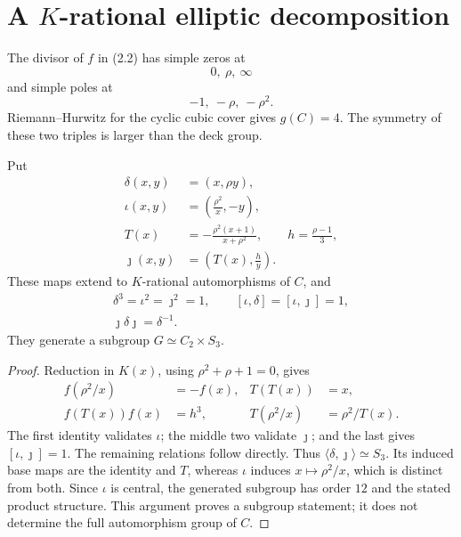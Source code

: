 \section{A \texorpdfstring{\(K\)}{K}-rational elliptic decomposition}
\label{sec:elliptic}

The divisor of \(f\) in (2.2) has simple zeros at
\[
 0,\ \rho,\ \infty
\]
and simple poles at
\[
 -1,\ -\rho,\ -\rho^2.
\]
Riemann--Hurwitz for the cyclic cubic cover gives \(g(C)=4\).  The
symmetry of these two triples is larger than the deck group.

\begin{proposition}\label{prop:automorphisms}
Put
\[
\begin{aligned}
 \delta(x,y)&=(x,\rho y),\\
 \iota(x,y)&=\left(\frac{\rho^2}{x},-y\right),\\
 T(x)&=-\frac{\rho^2(x+1)}{x+\rho^2},\qquad
 h=\frac{\rho-1}{3},\\
 \jmath(x,y)&=\left(T(x),\frac{h}{y}\right).
\end{aligned}                                           \tag{3.1}
\]
These maps extend to \(K\)-rational automorphisms of \(C\), and
\[
\begin{gathered}
 \delta^3=\iota^2=\jmath^2=1,\qquad
 [\iota,\delta]=[\iota,\jmath]=1,\\
 \jmath\delta\jmath=\delta^{-1}.
\end{gathered}                                          \tag{3.2}
\]
They generate a subgroup \(G\simeq C_2\times S_3\).
\end{proposition}

\begin{proof}
Reduction in \(K(x)\), using \(\rho^2+\rho+1=0\), gives
\[
\begin{aligned}
 f(\rho^2/x)&=-f(x),&
 T(T(x))&=x,\\
 f(T(x))f(x)&=h^3,&
 T(\rho^2/x)&=\rho^2/T(x).
\end{aligned}                                           \tag{3.3}
\]
The first identity validates \(\iota\); the middle two validate \(\jmath\);
and the last gives \([\iota,\jmath]=1\).  The remaining relations follow
directly.  Thus \(\langle\delta,\jmath\rangle\simeq S_3\).  Its induced base
maps are the identity and \(T\), whereas \(\iota\) induces
\(x\mapsto\rho^2/x\), which is distinct from both.  Since \(\iota\) is
central, the generated subgroup has order \(12\) and the stated product
structure.  This argument proves a subgroup statement; it does not determine
the full automorphism group of \(C\).
\end{proof}

